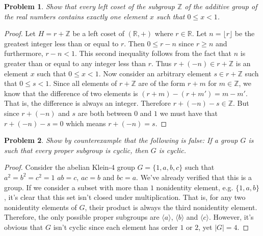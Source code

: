 \documentclass{article}
\newtheorem{problem}{Problem}
\begin{document}

\begin{problem}
Show that every left coset of the subgroup $\mathbb{Z}$ of the additive group of the real numbers contains exactly one element $x$ such that $0 \leq x < 1$.
\end{problem}
\begin{proof}
Let $H = r + \mathbb{Z}$ be a left coset of $(\mathbb{R}, +)$ where $r \in \mathbb{R}$. Let $n = \lfloor r \rfloor$ be the greatest integer less than or equal to $r$. Then $0 \leq r-n$ since $r \geq n$ and furthermore, $r-n < 1$. This second inequality follows from the fact that $n$ is greater than or equal to any integer less than $r$. Thus $r + (-n) \in r+\mathbb{Z}$ is an element $x$ such that $0 \leq x < 1$. Now consider an arbitrary element $s \in r + \mathbb{Z}$ such that $0 \leq s < 1$. Since all elements of $r + \mathbb{Z}$ are of the form $r + m$ for $m \in \mathbb{Z}$, we know that the difference of two elements is $(r + m) - (r + m') = m - m'$. That is, the difference is always an integer. Therefore $r + (-n) - s \in \mathbb{Z}$. But since $r + (-n)$ and $s$ are both between $0$ and $1$ we must have that $r + (-n) - s = 0$ which means $r + (-n) = s$.
\end{proof}

\begin{problem}
Show by counterexample that the following is false: If a group $G$ is such that every proper subgroup is cyclic, then $G$ is cyclic.
\end{problem}
\begin{proof}
Consider the abelian Klein-4 group $G = \{1,a,b,c\}$ such that $a^2 = b^2 = c^2 = 1$ $ab = c$, $ac = b$ and $bc = a$. We've already verified that this is a group. If we consider a subset with more than $1$ nonidentity element, e.g. $\{1,a,b\}$, it's clear that this set isn't closed under multiplication. That is, for any two nonidentity elements of $G$, their product is always the third nonidentity element. Therefore, the only possible proper subgroups are $\langle a \rangle$, $\langle b \rangle$ and $\langle c \rangle$. However, it's obvious that $G$ isn't cyclic since each element has order $1$ or $2$, yet $|G| = 4$.
\end{proof}
\end{document}
